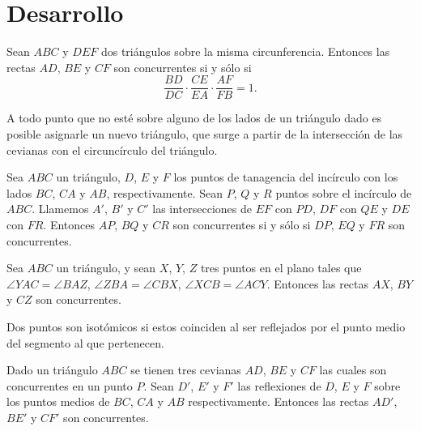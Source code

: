\section{Desarrollo}


\begin{section-theorem.tcb}
    Sean $ABC$ y $DEF$ dos triángulos sobre la misma circunferencia.
    Entonces las rectas $AD$, $BE$ y $CF$ son concurrentes si y sólo si
    \[\frac{BD}{DC} \cdot \frac{CE}{EA} \cdot \frac{AF}{FB} = 1.\]
\end{section-theorem.tcb}

\begin{section-definition}
    A todo punto que no esté sobre alguno de los lados de un triángulo dado es posible asignarle un nuevo triángulo, que surge a partir de la intersección de las cevianas con el circuncírculo del triángulo.
\end{section-definition}

\begin{section-theorem.tcb}
    Sea $ABC$ un triángulo, $D$, $E$ y $F$ los puntos de tanagencia del incírculo con los lados $BC$, $CA$ y $AB$, respectivamente.
    Sean $P$, $Q$ y $R$ puntos sobre el incírculo de $ABC$.
    Llamemos $A'$, $B'$ y $C'$ las intersecciones de $EF$ con $PD$, $DF$ con $QE$ y $DE$ con $FR$.
    Entonces $AP$, $BQ$ y $CR$ son concurrentes si y sólo si $DP$, $EQ$ y $FR$ son concurrentes.
\end{section-theorem.tcb}

\begin{section-theorem.tcb}
    Sea $ABC$ un triángulo, y sean $X$, $Y$, $Z$ tres puntos en el plano tales que $\angle YAC = \angle BAZ$, $\angle ZBA = \angle CBX$, $\angle XCB = \angle ACY$.
    Entonces las rectas $AX$, $BY$ y $CZ$ son concurrentes.
\end{section-theorem.tcb}

\begin{section-definition}
    Dos puntos son isotómicos si estos coinciden al ser reflejados por el punto medio del segmento al que pertenecen.
\end{section-definition}

\begin{section-definition}
    Dado un triángulo $ABC$ se tienen tres cevianas $AD$, $BE$ y $CF$ las cuales son concurrentes en un punto $P$.
    Sean $D'$, $E'$ y $F'$ las reflexiones de $D$, $E$ y $F$ sobre los puntos medios de $BC$, $CA$ y $AB$ respectivamente.
    Entonces las rectas $AD'$, $BE'$ y $CF'$ son concurrentes.
\end{section-definition}

